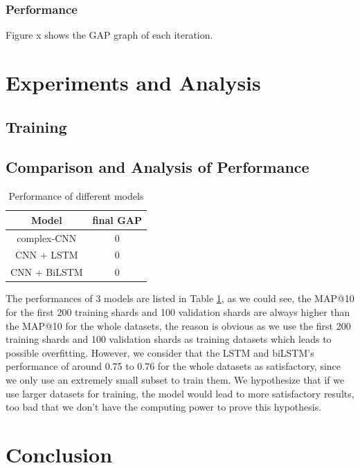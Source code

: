 \documentclass{article}
\begin{document}
\subsubsection{Performance}
Figure x shows the GAP graph of each iteration.

\newpage

\section{Experiments and Analysis}
\subsection{Training}



\subsection{Comparison and Analysis of Performance}
\begin{table} [h]
  \caption{Performance of different models}
  \label{table 1}
  \centering
  \begin{tabular}{c|c}
    \toprule
   	Model   	&  final GAP \\
    \midrule 
	complex-CNN & 0 \\
	CNN + LSTM  & 0  \\
	CNN + BiLSTM& 0  \\
	
	
    \bottomrule
  \end{tabular}
\end{table}
The performances of 3 models are listed in Table \ref{table 1}, as we could see, the MAP@10 for the first 200 training shards and 100 validation shards are always higher than the MAP@10 for the whole datasets, the reason is obvious as we use the first 200 training shards and 100 validation shards as training datasets which leads to possible overfitting. However, we consider that the LSTM and biLSTM's performance of around 0.75 to 0.76 for the whole datasets as satisfactory, since we only use an extremely small subset to train them. We hypothesize that if we use larger datasets for training, the model would lead to more satisfactory results, too bad that we don't have the computing power to prove this hypothesis.



\section{Conclusion}
\end{document}
